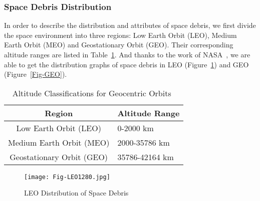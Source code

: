 \documentclass{mcmthesis}
\begin{document}
	
\subsubsection{Space Debris Distribution} \label{SubSec-DebriDistribution}
	
	In order to describe the distribution and attributes of space debris, we first divide the space environment into three regions: Low Earth Orbit (LEO), Medium Earth Orbit (MEO) and Geostationary Orbit (GEO). Their corresponding altitude ranges are listed in Table~\ref{Tab-LEO-MEO-GEO}. And thanks to the work of NASA~\cite{NASA_fig_1}, we are able to get the distribution graphs of space debris in LEO (Figure~\ref{Fig-LEO}) and GEO (Figure~\ref{Fig-GEO}).
	
	\begin{table}[htbp]
		\centering
		\caption{Altitude Classifications for Geocentric Orbits~\cite{Wiki_orbits}} \label{Tab-LEO-MEO-GEO}
		\begin{tabular}{cl}
			\hline
			Region & Altitude Range\\
			\hline
			\hline
			Low Earth Orbit (LEO) & 0-2000 km \\
			Medium Earth Orbit (MEO) & 2000-35786 km\\
			Geostationary Orbit (GEO) & 35786-42164 km\\
			\hline
		\end{tabular}
	\end{table}
	
	\begin{figure}[htbp]
		\centering
		\texttt{[image: Fig-LEO1280.jpg]}
		\caption{LEO Distribution of Space Debris}
		\label{Fig-LEO}
	\end{figure}
	
\end{document}
